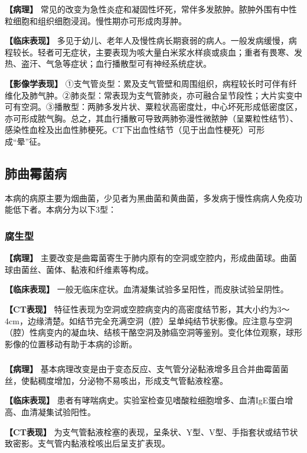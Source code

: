 \textbf{【病理】}
常见的改变为急性炎症和凝固性坏死，常伴多发脓肿。脓肿外围有中性粒细胞和组织细胞浸润。慢性期亦可形成肉芽肿。

\textbf{【临床表现】}
多见于幼儿、老年人及慢性病长期衰弱的病人。一般发病缓慢，病程较长。轻者可无症状，主要表现为咳大量白米浆水样痰或痰血；重者有畏寒、发热、盗汗、气急等症状；血行播散型可有神经系统症状。

\textbf{【影像学表现】}
①支气管炎型：累及支气管壁和周围组织，病程较长时可伴有纤维化及肺气肿。②肺炎型：常表现为支气管肺炎，亦可融合呈节段性；大片实变中可有空洞。③播散型：两肺多发片状、粟粒状高密度灶，中心坏死形成低密度区，亦可形成脓气胸。总之，其血行播散可导致两肺弥漫性微脓肿（呈粟粒性结节）、感染性血栓及出血性肺梗死。CT下出血性结节（见于出血性梗死）可形成“晕”征。

\subsection{肺曲霉菌病}

本病的病原主要为烟曲菌，少见者为黑曲菌和黄曲菌，多发病于慢性病病人免疫功能低下者。本病分为以下3型：

\subsubsection{腐生型}

\textbf{【病理】}
主要改变是曲霉菌寄生于肺内原有的空洞或空腔内，形成曲菌球。曲菌球由菌丝、菌体、黏液和纤维素等构成。

\textbf{【临床表现】}
一般无临床症状。血清凝集试验多呈阳性，而皮肤试验呈阴性。

\textbf{【CT表现】}
特征性表现为空洞或空腔病变内的高密度结节影，其大小约为3～4cm，边缘清楚。如结节完全充满空洞（腔）呈单纯结节状影像。应注意与空洞（腔）性病变内的凝血块、结核干酪空洞及肺癌空洞等鉴别。变化体位观察，球形影像的位置移动有助于本病的诊断。

\subsubsection{}

\textbf{【病理】}
基本病理改变是由于变态反应、支气管分泌黏液增多且合并曲霉菌菌丝，使黏稠度增加，分泌物不易咳出，形成支气管黏液栓塞。

\textbf{【临床表现】}
患者有哮喘病史。实验室检查见嗜酸粒细胞增多、血清IgE蛋白增高、血清凝集试验阳性。

\textbf{【CT表现】}
为支气管黏液栓塞的表现，呈条状、Y型、V型、手指套状或结节状致密影。支气管内黏液栓咳出后呈支扩表现。

